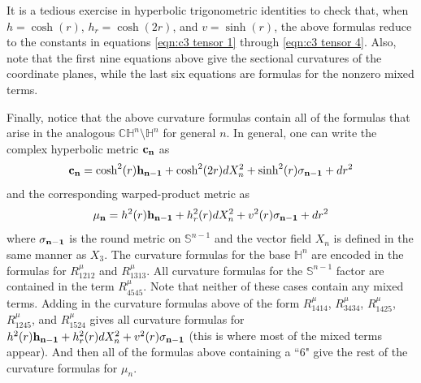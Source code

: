 \documentclass[10pt]{amsart}
\def\s{\sigma}
\def\l{\lambda}
\def\S{\mathcal{S}}
\def\Rl{R_{\l}}
\def\H{\mathbb{H}}
\def\C{\mathbb{C}}
\def\S{\mathbb{S}}
\theoremstyle{definition}
\theoremstyle{remark}
\numberwithin{equation}{section}
\begin{document}
\vskip 10pt
	
It is a tedious exercise in hyperbolic trigonometric identities to check that, when $h = \cosh(r)$, $h_r = \cosh(2r)$, and $v = \sinh(r)$, the above formulas reduce to the constants in equations \eqref{eqn:c3 tensor 1} through \eqref{eqn:c3 tensor 4}.  
Also, note that the first nine equations above give the sectional curvatures of the coordinate planes, while the last six equations are formulas for the nonzero mixed terms.

Finally, notice that the above curvature formulas contain all of the formulas that arise in the analogous $\C \H^n \setminus \H^n$ for general $n$.  
In general, one can write the complex hyperbolic metric ${\bf c_n}$ as
	\begin{equation*}
	{\bf c_n} = \cosh^2(r) {\bf h_{n-1}} + \cosh^2(2r) dX_n^2 + \sinh^2(r) {\bf \s_{n-1}} + dr^2
	\end{equation*}
and the corresponding warped-product metric as
	\begin{equation*}
	{\bf \mu_n} = h^2(r) {\bf h_{n-1}} + h_r^2(r) d X_n^2 + v^2(r) {\bf \s_{n-1}} + dr^2
	\end{equation*}
where ${\bf \s_{n-1}}$ is the round metric on $\S^{n-1}$ and the vector field $X_n$ is defined in the same manner as $X_3$.  
The curvature formulas for the base $\H^{n}$ are encoded in the formulas for $R^{\mu}_{1212}$ and $R^{\mu}_{1313}$.  
All curvature formulas for the $\S^{n-1}$ factor are contained in the term $R^{\mu}_{4545}$.
Note that neither of these cases contain any mixed terms.
Adding in the curvature formulas above of the form $R^{\mu}_{1414}$, $R^{\mu}_{3434}$, $R^{\mu}_{1425}$, $R^{\mu}_{1245}$, and $R^{\mu}_{1524}$ gives all curvature formulas for $h^2(r) {\bf h_{n-1}} + h_r^2(r) dX_n^2 + v^2(r) {\bf \s_{n-1}}$ (this is where most of the mixed terms appear).  
And then all of the formulas above containing a ``6" give the rest of the curvature formulas for $\mu_n$.












\vskip 20pt

\end{document}
